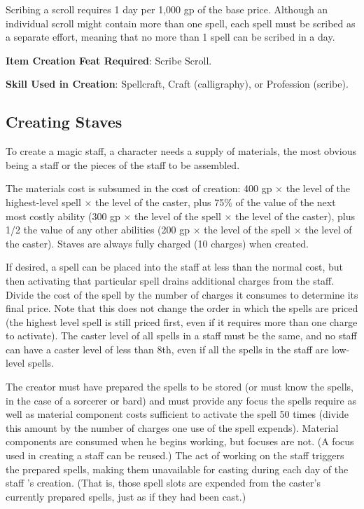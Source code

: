 Scribing a scroll requires 1 day per 1,000 gp of the base price. Although an individual scroll might contain more than one spell, each spell must be scribed as a separate effort, meaning that no more than 1 spell can be scribed in a day.
				
\textbf{Item Creation Feat Required}: Scribe Scroll.
				
\textbf{Skill Used in Creation}: Spellcraft, Craft (calligraphy), or Profession (scribe).
				
\subsection{Creating Staves}

				
To create a magic staff, a character needs a supply of materials, the most obvious being a staff or the pieces of the staff to be assembled.
				
The materials cost is subsumed in the cost of creation: 400 gp \mbox{$\times$} the level of the highest-level spell \mbox{$\times$} the level of the caster, plus 75\% of the value of the next most costly ability (300 gp \mbox{$\times$} the level of the spell \mbox{$\times$} the level of the caster), plus 1/2 the value of any other abilities (200 gp \mbox{$\times$} the level of the spell \mbox{$\times$} the level of the caster). Staves are always fully charged (10 charges) when created.
				
If desired, a spell can be placed into the staff at less than the normal cost, but then activating that particular spell drains additional charges from the staff. Divide the cost of the spell by the number of charges it consumes to determine its final price. Note that this does not change the order in which the spells are priced (the highest level spell is still priced first, even if it requires more than one charge to activate). The caster level of all spells in a staff must be the same, and no staff can have a caster level of less than 8th, even if all the spells in the staff are low-level spells.
				
The creator must have prepared the spells to be stored (or must know the spells, in the case of a sorcerer or bard) and must provide any focus the spells require as well as material component costs sufficient to activate the spell 50 times (divide this amount by the number of charges one use of the spell expends). Material components are consumed when he begins working, but focuses are not. (A focus used in creating a staff can be reused.) The act of working on the staff triggers the prepared spells, making them unavailable for casting during each day of the staff 's creation. (That is, those spell slots are expended from the caster's currently prepared spells, just as if they had been cast.)
				
